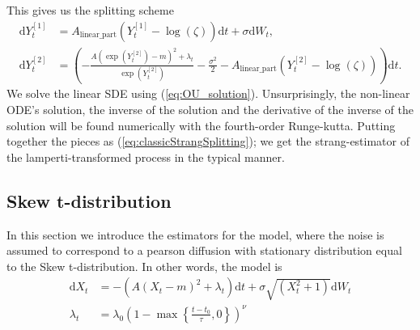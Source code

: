 This gives us the splitting scheme
\begin{align}
    \mathrm{d}Y_t^{[1]} &= A_{\mathrm{linear\_part}}\left(Y_t^{[1]} - \log\left(\zeta\right)\right)\mathrm{d}t + \sigma \mathrm{d}W_t,\\
    \mathrm{d}Y_t^{[2]} &= \left(-\frac{A\left(\exp\left(Y_t^{[2]}\right)-m\right)^2 + \lambda_t}{\exp\left(Y_t^{[2]}\right)} - \frac{\sigma^2}{2}%
    - A_{\mathrm{linear\_part}}\left(Y_t^{[2]} - \log\left(\zeta\right)\right)\right)\mathrm{d}t. \label{eq:GBMLampertiBasedStrang}
\end{align}
We solve the linear SDE using (\ref{eq:OU_solution}). Unsurprisingly, the non-linear ODE's solution, the inverse of the solution and the derivative of the inverse of the solution will be found numerically with the fourth-order Runge-kutta. Putting together the pieces as (\ref{eq:classicStrangSplitting}); we get the strang-estimator of the lamperti-transformed process in the typical manner.
\newpage
\subsection{Skew t-distribution}
In this section we introduce the estimators for the model, where the noise is assumed to correspond to a pearson diffusion with stationary distribution equal to the Skew t-distribution. In other words, the model is
\begin{align}
    \mathrm{d}X_t &= -\left(A\left(X_t - m\right)^2 + \lambda_t\right)\mathrm{d}t + \sigma \sqrt{\left(X_t^2 + 1\right)} \mathrm{d}W_t\\
    \lambda_t &= \lambda_0\left(1 - \max\left\{\frac{t - t_0}{\tau}, 0\right\}\right)^\nu
\end{align}
